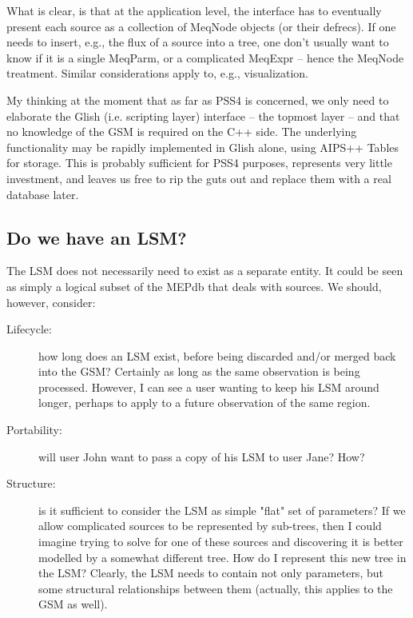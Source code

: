\documentclass[10pt]{article}
\begin{document}
What is clear, is that at the application level, the interface has to
eventually present each source as a collection of MeqNode objects (or their
defrecs). If one needs to insert, e.g., the flux of a source into a tree, one 
don't usually want to know if it is a single MeqParm, or a complicated MeqExpr
-- hence the MeqNode treatment. Similar considerations apply to, e.g.,
visualization. 

My thinking at the moment that as far as PSS4 is concerned, we only need to
elaborate the Glish (i.e. scripting layer) interface -- the topmost layer --
and that no knowledge of the GSM is required on the C++ side. The underlying
functionality may be rapidly implemented in Glish alone, using AIPS++ Tables
for storage. This is probably sufficient for PSS4 purposes, represents very
little investment, and leaves us free to rip the guts out and replace them with
a real database later. 

\subsection{Do we have an LSM?}

The LSM does not necessarily need to exist as a separate entity. It could be
seen as simply a logical subset of the MEPdb that deals with sources. We
should, however, consider:

\begin{description}

\item[Lifecycle:] how long does an LSM exist, before being discarded and/or
merged back into the GSM? Certainly as long as the same observation is being
processed. However, I can see a user wanting to keep his LSM around longer,
perhaps to apply to a future observation of the same region.

\item[Portability:] will user John want to pass a copy of his LSM to user Jane?
How?

\item[Structure:] is it sufficient to consider the LSM as simple "flat" set of
parameters? If we allow complicated sources to be represented by sub-trees,
then I could imagine trying to solve for one of these sources and discovering
it is better modelled by a somewhat different tree. How do I represent this new
tree in the LSM? Clearly, the LSM needs to contain not only parameters, but
some structural relationships between them (actually, this applies to the GSM as
well).

\end{description}
\end{document}
